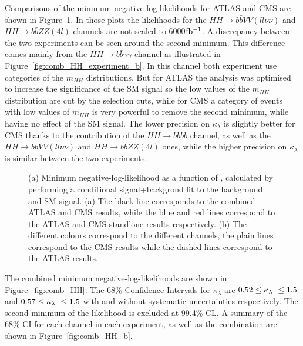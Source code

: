 Comparisons of the minimum negative-log-likelihoods for ATLAS and CMS are shown in Figure~\ref{fig:comb_HH_experiment}. In those plots the likelihoods for the $HH \rightarrow b\bar{b}VV(ll\nu\nu)$ and $HH \rightarrow b\bar{b}ZZ(4l)$ channels are not scaled to 6000$\mbox{fb$^{-1}$}$.
A discrepancy between the two experiments can be seen around the second minimum. This difference comes mainly from the $HH \rightarrow b\bar{b}\gamma\gamma$ channel as illustrated in Figure~\ref{fig:comb_HH_experiment_b}. In this channel both experiment use categories of the $m_{HH}$ distributions. But for ATLAS the analysis was optimised to increase the significance of the SM signal so the low values of the $m_{HH}$ distribution are cut by the selection cuts, while for CMS a category of events with low values of $m_{HH}$ is very powerful to remove the second minimum, while having no effect of the SM signal.
The lower precision on $\kappa_{\lambda}$ is slightly better for CMS thanks to the contribution of the $HH \rightarrow b\bar{b}b\bar{b}$ channel, as well as the $HH \rightarrow b\bar{b}VV(ll\nu\nu)$ and $HH \rightarrow b\bar{b}ZZ(4l)$ ones, while the higher precision on $\kappa_{\lambda}$ is similar between the two experiments.

\begin{figure}[!htb]
\centering 
{} 
\caption{(a) Minimum negative-log-likelihood as a function of \kl, calculated by performing a conditional signal+backgrond fit to the background and SM signal. (a) The black line corresponds to the combined ATLAS and CMS results, while the blue and red lines correspond to the ATLAS and CMS standlone results respectively. (b) The different colours correspond to the different channels, the plain lines correspond to the CMS results while the dashed lines correspond to the ATLAS results.} 
\label{fig:comb_HH_experiment} 
\end{figure}

The combined minimum negative-log-likelihoods are shown in Figure~\ref{fig:comb_HH}. 
The 68\% Confidence Intervals for $\kappa_{\lambda}$ are $0.52 \leq \kappa_{\lambda}\ \leq 1.5$ and $0.57 \leq \kappa_{\lambda}\ \leq 1.5$ with and without systematic uncertainties respectively. The second minimum of the likelihood is excluded at 99.4\% CL. A summary of the 68\% CI for each channel in each experiment, as well as the combination are shown in Figure~\ref{fig:comb_HH_b}.


